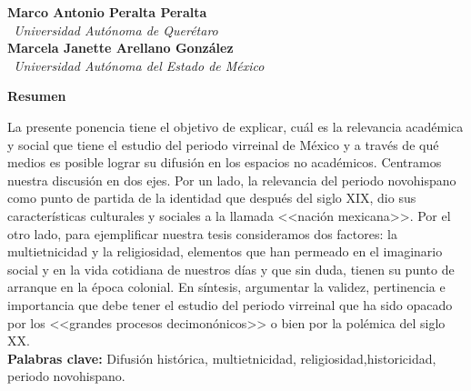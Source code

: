 \hrulefill{}



\thispagestyle{empty}%

{\par}
\setcounter{footnote}{0}


\bigskip
\begin{center}
{\bfseries Marco Antonio Peralta Peralta}\\
{\itshape\ Universidad Autónoma de Querétaro\/}\\
{\bfseries Marcela Janette Arellano González}\\
{\itshape\ Universidad Autónoma del Estado de México}
\end{center}

\bigskip
\textbf{Resumen}

La presente ponencia tiene el objetivo de explicar, cuál es la
relevancia académica y social que tiene el estudio del periodo virreinal de
México y a través de qué medios es posible lograr su difusión en los espacios
no académicos. Centramos nuestra discusión en dos ejes. Por un lado, la
relevancia del periodo novohispano como punto de partida de la identidad que
después del siglo XIX, dio sus características culturales y sociales a la
llamada <<nación mexicana>>. Por el otro  lado, para ejemplificar  nuestra tesis
consideramos dos factores: la multietnicidad y la religiosidad, elementos que
han permeado en el imaginario social y en la vida cotidiana de nuestros días y
que sin duda, tienen su punto de arranque en  la época colonial. En síntesis,
argumentar la validez, pertinencia e importancia que debe tener el estudio del
periodo virreinal que ha sido opacado por los <<grandes procesos decimonónicos>>
o bien por la polémica del siglo XX.\\
\textbf{Palabras clave:} Difusión histórica, multietnicidad,
religiosidad,\linebreak historicidad, periodo novohispano.
\newpage

